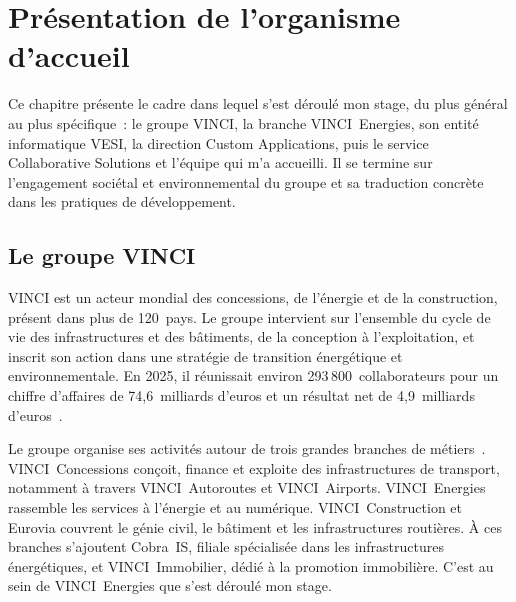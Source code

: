 
\chapter{Présentation de l'organisme d'accueil}
\label{chap:organisme}

Ce chapitre présente le cadre dans lequel s'est déroulé mon stage, du plus
général au plus spécifique~: le groupe VINCI, la branche VINCI~Energies,
son entité informatique VESI, la direction Custom Applications, puis le
service Collaborative Solutions et l'équipe qui m'a accueilli. Il se termine
sur l'engagement sociétal et environnemental du groupe et sa traduction
concrète dans les pratiques de développement.

\section{Le groupe VINCI}
\label{sec:groupe-vinci}

VINCI est un acteur mondial des concessions, de l'énergie et de la
construction, présent dans plus de 120~pays. Le groupe intervient sur
l'ensemble du cycle de vie des infrastructures et des bâtiments, de la
conception à l'exploitation, et inscrit son action dans une stratégie de
transition énergétique et environnementale. En 2025, il réunissait environ
293\,800~collaborateurs pour un chiffre d'affaires de 74,6~milliards d'euros
et un résultat net de 4,9~milliards d'euros~\cite{vinci_urd2024}.

Le groupe organise ses activités autour de trois grandes branches de métiers~\cite{wiki_vinci}.
VINCI~Concessions conçoit, finance et exploite des infrastructures
de transport, notamment à travers VINCI~Autoroutes et VINCI~Airports.
VINCI~Energies rassemble les services à l'énergie et au numérique.
VINCI~Construction et Eurovia couvrent le génie civil, le bâtiment et les
infrastructures routières. À ces branches s'ajoutent Cobra~IS, filiale
spécialisée dans les infrastructures énergétiques, et VINCI~Immobilier,
dédié à la promotion immobilière. C'est au sein de VINCI~Energies que
s'est déroulé mon stage.

